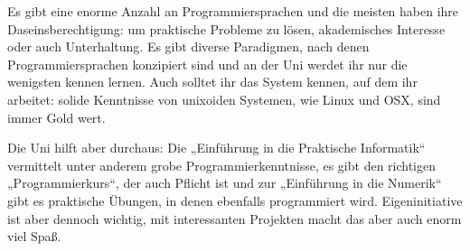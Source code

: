 Es gibt eine enorme Anzahl an Programmiersprachen und die meisten haben ihre Daseinsberechtigung: um praktische Probleme zu lösen, akademisches Interesse oder auch Unterhaltung. Es gibt diverse Paradigmen, nach denen Programmiersprachen konzipiert sind und an der Uni werdet ihr nur die wenigsten kennen lernen. Auch solltet ihr das System kennen, auf dem ihr arbeitet: solide Kenntnisse von unixoiden Systemen, wie Linux und OSX, sind immer Gold wert.

Die Uni hilft aber durchaus: Die „Einführung in die Praktische Informatik“ vermittelt unter anderem grobe Programmierkenntnisse, es gibt den richtigen „Programmierkurs“, der auch Pflicht ist und zur „Einführung in die Numerik“ gibt es praktische Übungen, in denen ebenfalls programmiert wird. Eigeninitiative ist aber dennoch wichtig, mit interessanten Projekten macht das aber auch enorm viel Spaß.

\vspace{-\parskip}
